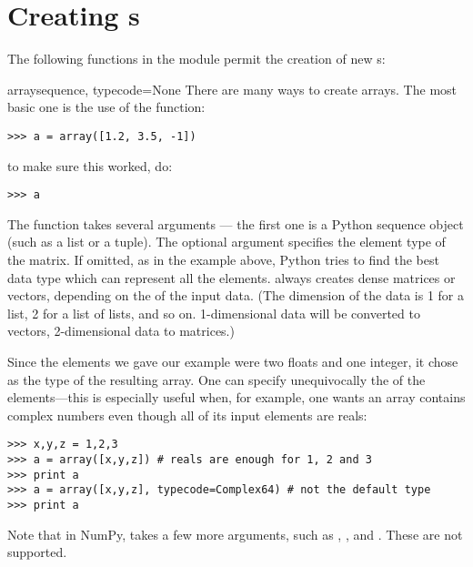 \section{Creating s}

The following functions in the module  permit
the creation of new s:

\begin{funcdesc}{array}{sequence, typecode=None}
   There are many ways to create arrays. The most basic one is the use of the
    function:
\begin{verbatim}
>>> a = array([1.2, 3.5, -1])
\end{verbatim}
   to make sure this worked, do:
\begin{verbatim}
>>> a
\end{verbatim}
   The  function takes several arguments --- the first
   one is a Python sequence object (such as a list or a tuple).  The
   optional argument  specifies the element type of the
   matrix. If omitted, as in the example above, Python tries to find
   the best data type which can represent all the
   elements.  always creates dense matrices or
   vectors, depending on the  of
   the input data.  (The dimension of the data is 1 for a list, 2 for
   a list of lists, and so on.  1-dimensional data will be converted
   to vectors, 2-dimensional data to matrices.)
   
   Since the elements we gave our example were two floats and one integer, it
   chose  as the type of the resulting array. One can specify
   unequivocally the  of the elements---this is especially 
   useful when, for example, one wants an array contains complex numbers even
   though all of its input elements are reals:
\begin{verbatim}
>>> x,y,z = 1,2,3
>>> a = array([x,y,z]) # reals are enough for 1, 2 and 3
>>> print a
>>> a = array([x,y,z], typecode=Complex64) # not the default type
>>> print a
\end{verbatim}
    Note that in NumPy,  takes a few more arguments, such as
    , , and . These are not supported.
\end{funcdesc}

